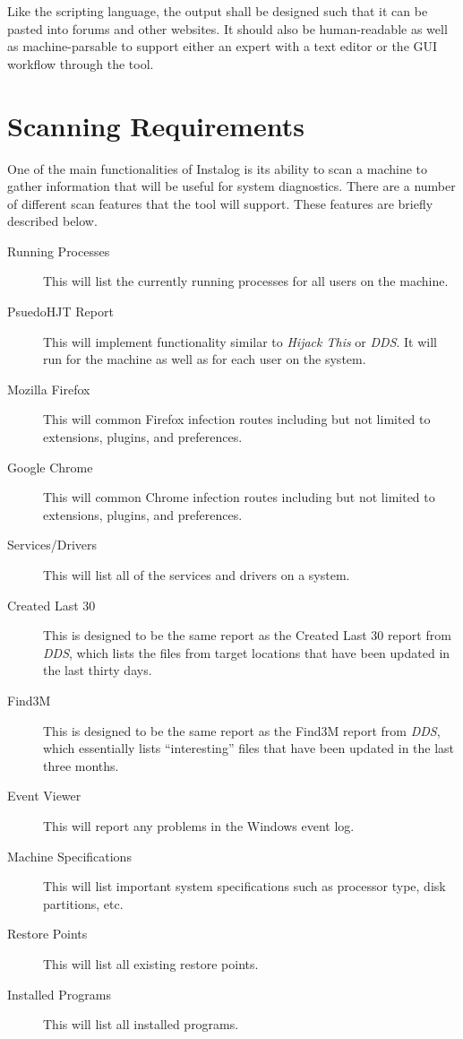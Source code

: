 \documentclass[letterpaper,12pt]{article}
\begin{document}
Like the scripting language, the output shall be designed such that it can be
pasted into forums and other websites.  It should also be human-readable as well
as machine-parsable to support either an expert with a text editor or the GUI
workflow through the tool.  

\newpage



\section{Scanning Requirements} \label{scanning}
One of the main functionalities of Instalog is its ability to scan a machine to
gather information that will be useful for system diagnostics.  There are a
number of different scan features that the tool will support.  These features
are briefly described below.

\begin{description}
    \item[Running Processes] This will list the currently running processes for
    all users on the machine.
    \item[PsuedoHJT Report] This will implement functionality similar to
    \textit{Hijack This} or \textit{DDS}.  It will run for the machine as well
    as for each user on the system.
    \item[Mozilla Firefox] This will common Firefox infection routes including
    but not limited to extensions, plugins, and preferences.
    \item[Google Chrome] This will common Chrome infection routes including
    but not limited to extensions, plugins, and preferences.
    \item[Services/Drivers] This will list all of the services and drivers on a
    system.
    \item[Created Last 30] This is designed to be the same report as the Created
    Last 30 report from \textit{DDS}, which lists the files from target
    locations that have been updated in the last thirty days.
    \item[Find3M] This is designed to be the same report as the Find3M report
    from \textit{DDS}, which essentially lists ``interesting'' files that have
    been updated in the last three months.
    \item[Event Viewer] This will report any problems in the Windows event log.
    \item[Machine Specifications] This will list important system specifications
    such as processor type, disk partitions, etc.
    \item[Restore Points] This will list all existing restore points.
    \item[Installed Programs] This will list all installed programs.
\end{description}
\end{document}
